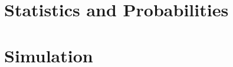 \documentclass[10pt,a4paper]{report}
\begin{document}
\chapter{Statistics and Probabilities}
\label{chap:stats}

\chapter{Simulation}
\label{chap:simulation}

\newpage
{}

\begin{small}
 \printindex
\end{small}

\end{document}
